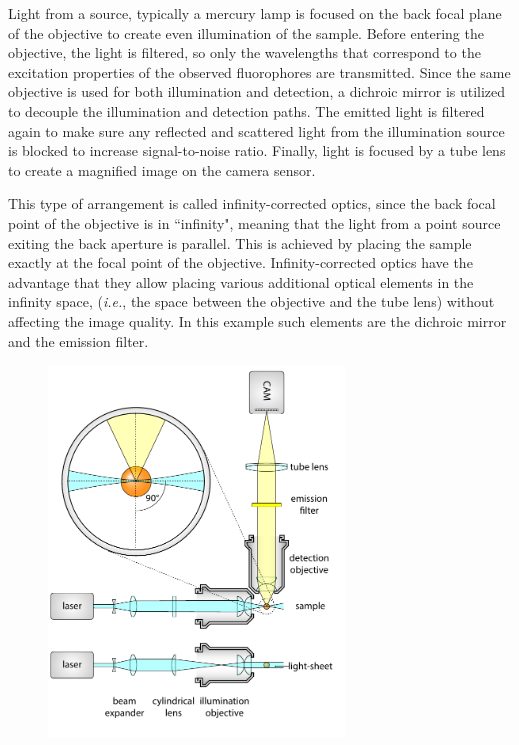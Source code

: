    Light from a source, typically a mercury lamp is focused on the back focal plane of the objective to create even illumination of the sample. Before entering the objective, the light is filtered, so only the wavelengths that correspond to the excitation properties of the observed fluorophores are transmitted. Since the same objective is used for both illumination and detection, a dichroic mirror is utilized to decouple the illumination and detection paths. The emitted light is filtered again to make sure any reflected and scattered light from the illumination source is blocked to increase signal-to-noise ratio.
    Finally, light is focused by a tube lens to create a magnified image on the camera sensor.
    
    This type of arrangement is called infinity-corrected optics, since the back focal point of the objective is in ``infinity", meaning that the light from a point source exiting the back aperture is parallel. This is achieved by placing the sample exactly at the focal point of the objective. Infinity-corrected optics have the advantage that they allow placing various additional optical elements in the infinity space, (\textit{i.e.}, the space between the objective and the tube lens) without affecting the image quality. In this example such elements are the dichroic mirror and the emission filter. 

    \begin{figure}[tb]
      \centering
      \includegraphics[page=4,width=0.7\textwidth]{spim_cyl}
      \label{fig:wide-field}
    \end{figure}


